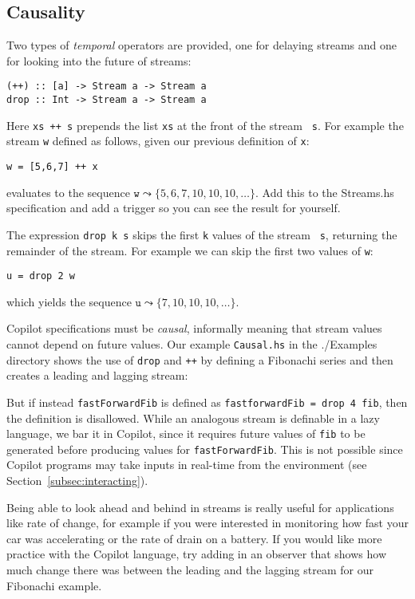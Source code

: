 \subsection{Causality} 
Two types of \emph{temporal} operators are provided, one for delaying streams and one for
looking into the future of streams:
%
\begin{lstlisting}[language = Copilot, frame = single]
(++) :: [a] -> Stream a -> Stream a
drop :: Int -> Stream a -> Stream a
\end{lstlisting}
%
Here {\tt xs ++ s} prepends the list {\tt xs} at the front of the stream {\tt
s}.
%
For example the stream {\tt w} defined as follows, given our previous
definition of {\tt x}:
%
\begin{lstlisting}[language = Copilot, frame = single]
w = [5,6,7] ++ x
\end{lstlisting}
%
evaluates to the sequence $\mathtt{w} \leadsto \{5, 6, 7, 10, 10, 10, \dots\}$.
%
Add this to the Streams.hs specification and add a trigger so you can see the
result for yourself.

The expression {\tt drop k s} skips the first {\tt k} values of the stream {\tt
s}, returning the remainder of the stream.
%
For example we can skip the first two values of {\tt w}:
%
\begin{lstlisting}[language = Copilot, frame = single]
u = drop 2 w
\end{lstlisting}
%
which yields the sequence $\mathtt{u} \leadsto \{7, 10, 10, 10, \dots\}$.

Copilot specifications must be \emph{causal}, informally meaning that stream
values cannot depend on future values.
%
Our example \texttt{Causal.hs} in the ./Examples directory shows the use of
{\tt drop} and {\tt ++} by defining a Fibonachi series and then creates a
leading and lagging stream:
%

%

But if instead {\tt fastForwardFib} is defined as {\tt fastforwardFib = drop 4
fib}, then the definition is disallowed.
%
While an analogous stream is definable in a lazy language, we bar it in
Copilot, since it requires future values of {\tt fib} to be generated before
producing values for {\tt fastForwardFib}.
%
This is not possible since Copilot programs may take inputs in real-time from
the environment (see Section~\ref{subsec:interacting}).

Being able to look ahead and behind in streams is really useful for applications like
rate of change, for example if you were interested in monitoring how fast your car was
accelerating or the rate of drain on a battery.
%
If you would like more practice with the Copilot language, try adding in an
observer that shows how much change there was between the leading and the
lagging stream for our Fibonachi example.
%
